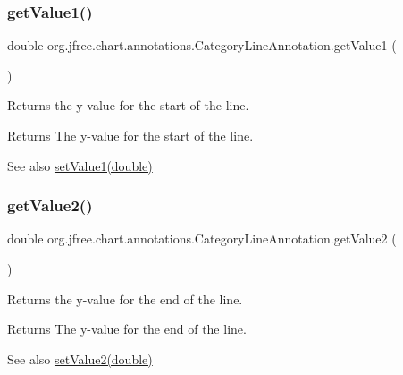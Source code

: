 \subsubsection{\texorpdfstring{get\+Value1()}{getValue1()}}
{\footnotesize\ttfamily double org.\+jfree.\+chart.\+annotations.\+Category\+Line\+Annotation.\+get\+Value1 (\begin{DoxyParamCaption}{ }\end{DoxyParamCaption})}

Returns the y-\/value for the start of the line.

\begin{DoxyReturn}{Returns}
The y-\/value for the start of the line.
\end{DoxyReturn}
\begin{DoxySeeAlso}{See also}
\mbox{\hyperlink{classorg_1_1jfree_1_1chart_1_1annotations_1_1_category_line_annotation_a781fe86987bd6b0b714f52385eeea200}{set\+Value1(double)}} 
\end{DoxySeeAlso}
\mbox{\label{classorg_1_1jfree_1_1chart_1_1annotations_1_1_category_line_annotation_ad87150da9363210985e430ad0c1135e2}} 
\subsubsection{\texorpdfstring{get\+Value2()}{getValue2()}}
{\footnotesize\ttfamily double org.\+jfree.\+chart.\+annotations.\+Category\+Line\+Annotation.\+get\+Value2 (\begin{DoxyParamCaption}{ }\end{DoxyParamCaption})}

Returns the y-\/value for the end of the line.

\begin{DoxyReturn}{Returns}
The y-\/value for the end of the line.
\end{DoxyReturn}
\begin{DoxySeeAlso}{See also}
\mbox{\hyperlink{classorg_1_1jfree_1_1chart_1_1annotations_1_1_category_line_annotation_a5857a0ef19b2eed096cd086cbcb972d6}{set\+Value2(double)}} 
\end{DoxySeeAlso}
\mbox{\label{classorg_1_1jfree_1_1chart_1_1annotations_1_1_category_line_annotation_aa0d5fb7fffa526636264edf58ca4dcab}} 
